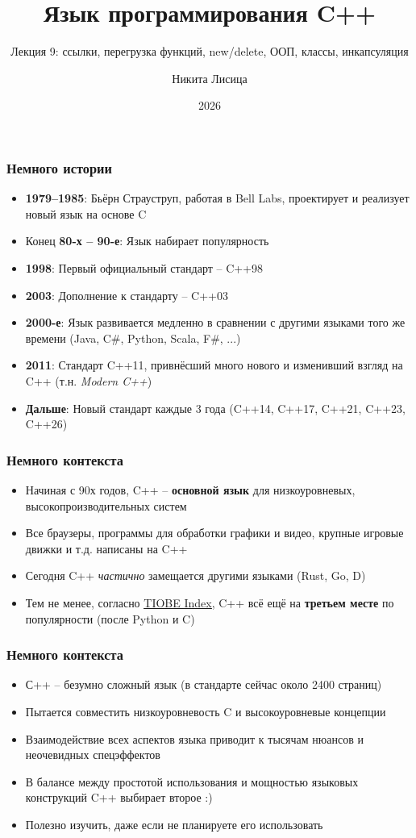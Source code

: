 \documentclass[10pt]{beamer}
\title{Язык программирования C++}
\subtitle{Лекция 9: ссылки, перегрузка функций, new/delete, ООП, классы, инкапсуляция}
\date{2026}
\author{Никита Лисица}
\begin{document}
\frame{\titlepage}

\begin{frame}
\frametitle{Немного истории}
\begin{itemize}
\item \textbf{1979--1985}: Бьёрн Страуструп, работая в Bell Labs, проектирует и реализует новый язык на основе C
\pause
\item Конец \textbf{80-х -- 90-е}: Язык набирает популярность
\pause
\item \textbf{1998}: Первый официальный стандарт -- C++98
\pause
\item \textbf{2003}: Дополнение к стандарту -- C++03
\pause
\item \textbf{2000-е}: Язык развивается медленно в сравнении с другими языками того же времени (Java, C\#, Python, Scala, F\#, ...)
\pause
\item \textbf{2011}: Стандарт C++11, привнёсший много нового и изменивший взгляд на C++ (т.н. \textit{Modern C++})
\pause
\item \textbf{Дальше}: Новый стандарт каждые 3 года (C++14, C++17, C++21, C++23, C++26)
\end{itemize}
\end{frame}

\begin{frame}
\frametitle{Немного контекста}
\begin{itemize}
\item Начиная с 90х годов, C++ -- \textbf{основной язык} для низкоуровневых, высокопроизводительных систем
\pause
\item Все браузеры, программы для обработки графики и видео, крупные игровые движки и т.д. написаны на C++
\pause
\item Сегодня C++ \textit{частично} замещается другими языками (Rust, Go, D)
\pause
\item Тем не менее, согласно \href{https://www.tiobe.com/tiobe-index/}{\alert{\underline{TIOBE Index}}}, C++ всё ещё на \textbf{третьем месте} по популярности (после Python и C)
\end{itemize}
\end{frame}

\begin{frame}
\frametitle{Немного контекста}
\begin{itemize}
\item С++ -- безумно сложный язык (в стандарте сейчас около 2400 страниц)
\pause
\item Пытается совместить низкоуровневость C и высокоуровневые концепции
\pause
\item Взаимодействие всех аспектов языка приводит к тысячам нюансов и неочевидных спецэффектов
\pause
\item В балансе между простотой использования и мощностью языковых конструкций C++ выбирает второе :)
\pause
\item Полезно изучить, даже если не планируете его использовать
\end{itemize}
\end{frame}
\end{document}

